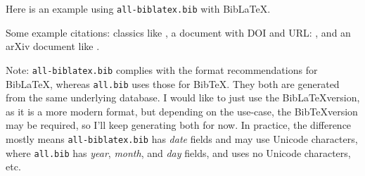 \documentclass{article}
\begin{document}

Here is an example using \texttt{all-biblatex.bib} with Bib\LaTeX{}.

Some example citations: classics like \textcite{chomsky.n:1957, kolmogorov.a:1968,
tesniere.l:1959, estes.w:1959}, a document with DOI and URL: \textcite{earley.j:1970},
and an arXiv document like \textcite{tay.y:2022}.

Note: \texttt{all-biblatex.bib} complies with
the format recommendations for Bib\LaTeX, whereas \texttt{all.bib} uses those for Bib\TeX. 
They both are generated from the same underlying database.
I would like to just use the Bib\LaTeX version, as it is a more modern format, but depending on the use-case, the Bib\TeX version may be required, so I'll keep generating both for now. In practice, the difference mostly means \texttt{all-biblatex.bib} has \emph{date} fields and may use Unicode characters, where \texttt{all.bib} has \emph{year}, \emph{month}, and \emph{day} fields, and uses no Unicode characters, etc.

\printbibliography
\end{document}
